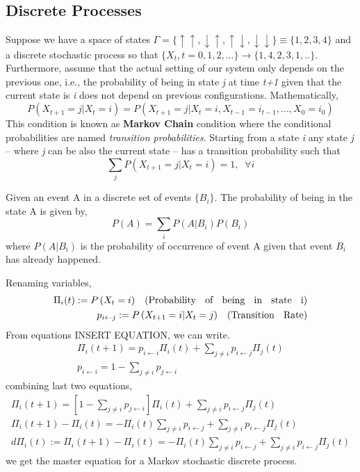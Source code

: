 \subsection{Discrete Processes}
Suppose we have a space of states $\Gamma = \{\uparrow \uparrow,\downarrow \uparrow,\uparrow \downarrow,\downarrow \downarrow \} \equiv \{1, 2, 3, 4 \}$ and a discrete stochastic process so that $\{X_{t}, t= 0,1,2,...\} \rightarrow \{1,4,2,3,1,..\}$. Furthermore, assume that the actual setting of our system only depends on the previous one, i.e., the probability of being in state \textit{j} at time \textit{t+1} given that the current state is \textit{i} does not depend on previous configurations. Mathematically,
\begin{equation}
    P\left(X_{t+1} = j | X_{t} = i\right) = P\left(X_{t+1}=j | X_{t} = i, X_{t-1} =i_{t-1},...,X_{0} = i_{0}\right)
\end{equation}
This condition is known as \textbf{Markov Chain} condition where the conditional probabilities are named \textit{ transition probabilities}. Starting from a state  \textit{i} any state \textit{j} -- where \textit{j} can be also the current state -- has a transition probability such that
\begin{equation}
    \sum_{j}P\left(X_{t+1} = j | X_{t} = i\right) = 1, \;\; \forall i
\end{equation}
\begin{theorem}
Given an event A in a discrete set of events $\{B_{i}\}$. The probability of being in the state A is given by,
\begin{equation}
    P\left(A\right) = \sum_{i}P\left(A|B_{i}\right)P\left(B_{i}\right)
\end{equation}
where $P\left(A|B_{i}\right)$ is the probability of occurrence of event A given that event $B_{i}$ has already happened. 
\end{theorem}
Renaming variables,
\begin{align}
    \Pi_{i}(t) := P\left(X_{t} = i\right) \;\;\; \text{(Probability \; of \; being \; in \; state \; i)} \\
    p_{i \leftarrow j} := P\left(X_{t+1} = i | X_{t}=j\right) \;\;\; \text{(Transition \; Rate)}
\end{align}
From equations INSERT EQUATION, we can write.
\begin{align*}
        \Pi_{i}(t+1) = p_{i \leftarrow i}\Pi_{i}(t) + \sum_{j \neq i} p_{i \leftarrow j}\Pi_{j}(t) \\ 
        p_{i \leftarrow i} = 1 - \sum_{j\neq i}p_{j \leftarrow i}
\end{align*}
combining last two equations,
\begin{align}
    \Pi_{i}(t+1) = \left[1 - \sum_{j\neq i}p_{j \leftarrow i}\right]\Pi_{i}(t) + \sum_{j\neq i}p_{i \leftarrow j}\Pi_{j}(t)\\
    \Pi_{i}(t+1) - \Pi_{i}(t) = -\Pi_{i}(t) \sum_{j \neq i}p_{i \leftarrow j} + \sum_{j \neq i} p_{i \leftarrow j}\Pi_{j}(t) \\
    d\Pi_{i}(t) := \Pi_{i}(t+1) - \Pi_{i}(t) =  -\Pi_{i}(t) \sum_{j \neq i}p_{i \leftarrow j} + \sum_{j \neq i} p_{i \leftarrow j}\Pi_{j}(t)
\end{align}
we get the master equation for a Markov stochastic discrete process.
